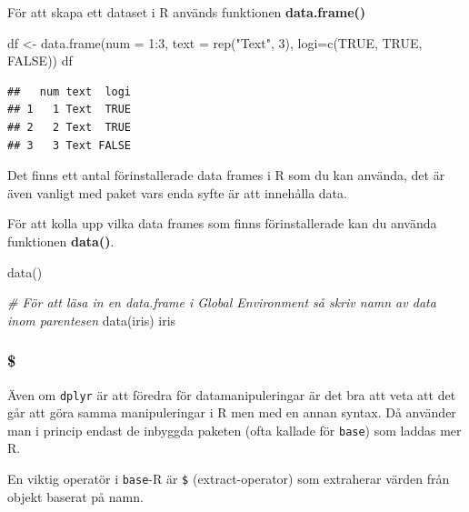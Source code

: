 \documentclass[
]{book}
\newenvironment{Shaded}{\begin{snugshade}}{\end{snugshade}}
\newcommand{\AttributeTok}[1]{\textcolor[rgb]{0.77,0.63,0.00}{#1}}
\newcommand{\CommentTok}[1]{\textcolor[rgb]{0.56,0.35,0.01}{\textit{#1}}}
\newcommand{\ConstantTok}[1]{\textcolor[rgb]{0.00,0.00,0.00}{#1}}
\newcommand{\DecValTok}[1]{\textcolor[rgb]{0.00,0.00,0.81}{#1}}
\newcommand{\FunctionTok}[1]{\textcolor[rgb]{0.00,0.00,0.00}{#1}}
\newcommand{\NormalTok}[1]{#1}
\newcommand{\OtherTok}[1]{\textcolor[rgb]{0.56,0.35,0.01}{#1}}
\newcommand{\SpecialCharTok}[1]{\textcolor[rgb]{0.00,0.00,0.00}{#1}}
\newcommand{\StringTok}[1]{\textcolor[rgb]{0.31,0.60,0.02}{#1}}
\begin{document}
För att skapa ett dataset i R används funktionen \textbf{data.frame()}

\begin{Shaded}
\begin{Highlighting}[]
\NormalTok{df }\OtherTok{\textless{}{-}} \FunctionTok{data.frame}\NormalTok{(}\AttributeTok{num =} \DecValTok{1}\SpecialCharTok{:}\DecValTok{3}\NormalTok{, }\AttributeTok{text =} \FunctionTok{rep}\NormalTok{(}\StringTok{"Text"}\NormalTok{, }\DecValTok{3}\NormalTok{), }\AttributeTok{logi=}\FunctionTok{c}\NormalTok{(}\ConstantTok{TRUE}\NormalTok{, }\ConstantTok{TRUE}\NormalTok{, }\ConstantTok{FALSE}\NormalTok{)) }
\NormalTok{df }
\end{Highlighting}
\end{Shaded}

\begin{verbatim}
##   num text  logi
## 1   1 Text  TRUE
## 2   2 Text  TRUE
## 3   3 Text FALSE
\end{verbatim}

Det finns ett antal förinstallerade data frames i R som du kan använda, det är även vanligt med paket vars enda syfte är att innehålla data.

För att kolla upp vilka data frames som finns förinstallerade kan du använda funktionen \textbf{data()}.

\begin{Shaded}
\begin{Highlighting}[]
\FunctionTok{data}\NormalTok{()}

\CommentTok{\# För att läsa in en data.frame i Global Environment så skriv namn av data inom parentesen}
\FunctionTok{data}\NormalTok{(iris)}
\NormalTok{iris}
\end{Highlighting}
\end{Shaded}

\hypertarget{section}{%
\subsubsection{\$}\label{section}}

Även om \texttt{dplyr} är att föredra för datamanipuleringar är det bra att veta att det går att göra samma manipuleringar i R men med en annan syntax. Då använder man i princip endast de inbyggda paketen (ofta kallade för \texttt{base}) som laddas mer R.

En viktig operatör i \texttt{base}-R är \texttt{\$} (extract-operator) som extraherar värden från objekt baserat på namn.
\end{document}
